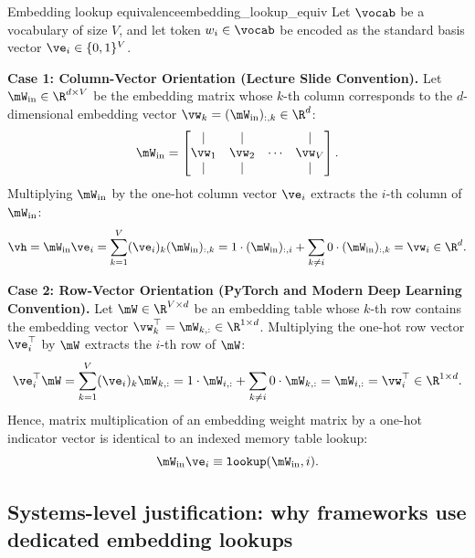 \documentclass[../../main.tex]{subfiles}
\begin{document}
\begin{theorem}{Embedding lookup equivalence}{embedding_lookup_equiv}
Let $\vocab$ be a vocabulary of size $V$, and let token $w_i \in \vocab$ be encoded as the standard basis vector $\ve_i \in \{0, 1\}^V$.

\noindent\textbf{Case 1: Column-Vector Orientation (Lecture Slide Convention).}  
Let $\mW_{\text{in}} \in \R^{d \times V}$ be the embedding matrix whose $k$-th column corresponds to the $d$-dimensional embedding vector $\vw_k = (\mW_{\text{in}})_{:, k} \in \R^d$:
\begin{equation}
\label{eq:win_column_blocks}
\mW_{\text{in}} = \begin{bmatrix} \vert & \vert & & \vert \\ \vw_1 & \vw_2 & \cdots & \vw_V \\ \vert & \vert & & \vert \end{bmatrix}.
\end{equation}
Multiplying $\mW_{\text{in}}$ by the one-hot column vector $\ve_i$ extracts the $i$-th column of $\mW_{\text{in}}$:
\begin{equation}
\label{eq:column_lookup_proof}
\vh = \mW_{\text{in}} \ve_i = \sum_{k=1}^V (\ve_i)_k (\mW_{\text{in}})_{:, k} = 1 \cdot (\mW_{\text{in}})_{:, i} + \sum_{k \neq i} 0 \cdot (\mW_{\text{in}})_{:, k} = \vw_i \in \R^d.
\end{equation}

\noindent\textbf{Case 2: Row-Vector Orientation (PyTorch and Modern Deep Learning Convention).}  
Let $\mW \in \R^{V \times d}$ be an embedding table whose $k$-th row contains the embedding vector $\vw_k^\top = \mW_{k, :} \in \R^{1 \times d}$. Multiplying the one-hot row vector $\ve_i^\top$ by $\mW$ extracts the $i$-th row of $\mW$:
\begin{equation}
\label{eq:row_lookup_proof}
\ve_i^\top \mW = \sum_{k=1}^V (\ve_i)_k \mW_{k, :} = 1 \cdot \mW_{i, :} + \sum_{k \neq i} 0 \cdot \mW_{k, :} = \mW_{i, :} = \vw_i^\top \in \R^{1 \times d}.
\end{equation}
Hence, matrix multiplication of an embedding weight matrix by a one-hot indicator vector is identical to an indexed memory table lookup:
\begin{equation}
\label{eq:lookup_linear_identity}
\mW_{\text{in}} \ve_i \equiv \text{\texttt{lookup}}(\mW_{\text{in}}, i).
\end{equation}
\end{theorem}

\subsection{Systems-level justification: why frameworks use dedicated embedding lookups}
\label{subsec:systems_embedding_justification}
\end{document}
